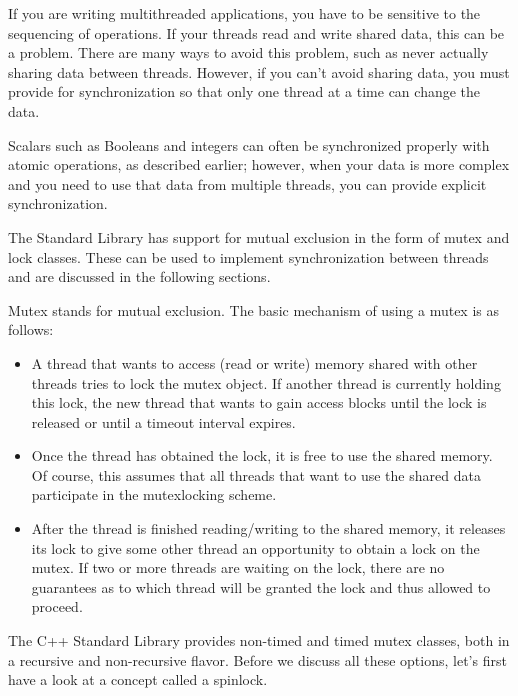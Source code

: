 
If you are writing multithreaded applications, you have to be sensitive to the sequencing of operations. If your threads read and write shared data, this can be a problem. There are many ways to avoid this problem, such as never actually sharing data between threads. However, if you can’t avoid sharing data, you must provide for synchronization so that only one thread at a time can change the data.

Scalars such as Booleans and integers can often be synchronized properly with atomic operations, as described earlier; however, when your data is more complex and you need to use that data from multiple threads, you can provide explicit synchronization.

The Standard Library has support for mutual exclusion in the form of mutex and lock classes. These can be used to implement synchronization between threads and are discussed in the following sections.


Mutex stands for mutual exclusion. The basic mechanism of using a mutex is as follows:

\begin{itemize}
\item
A thread that wants to access (read or write) memory shared with other threads tries to lock the mutex object. If another thread is currently holding this lock, the new thread that wants to gain access blocks until the lock is released or until a timeout interval expires.

\item
Once the thread has obtained the lock, it is free to use the shared memory. Of course, this assumes that all threads that want to use the shared data participate in the mutexlocking scheme.

\item
After the thread is finished reading/writing to the shared memory, it releases its lock to give some other thread an opportunity to obtain a lock on the mutex. If two or more threads are waiting on the lock, there are no guarantees as to which thread will be granted the lock and thus allowed to proceed.
\end{itemize}

The C++ Standard Library provides non-timed and timed mutex classes, both in a recursive and non-recursive flavor. Before we discuss all these options, let’s first have a look at a concept called a spinlock.


